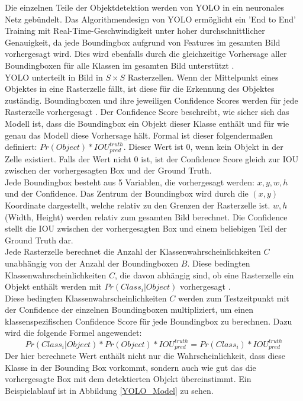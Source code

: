 {{	Die einzelnen Teile der Objektdetektion werden von YOLO in ein neuronales Netz gebündelt. Das Algorithmendesign von YOLO ermöglicht ein 'End to End' Training mit Real-Time-Geschwindigkeit unter hoher durchschnittlicher Genauigkeit, da jede Boundingbox aufgrund von Features im gesamten Bild vorhergesagt wird. Dies wird ebenfalls durch die gleichzeitige Vorhersage aller Boundingboxen für alle Klassen im gesamten Bild unterstützt \citep{Plastiras2018}. \\
	YOLO unterteilt in Bild in $S \times S $ Rasterzellen. Wenn der Mittelpunkt eines Objektes in eine Rasterzelle fällt, ist diese für die Erkennung des Objektes zuständig. Boundingboxen und ihre jeweiligen Confidence Scores werden für jede Rasterzelle vorhergesagt \citep{Plastiras2018}.
	Der Confidence Score beschreibt, wie sicher sich das Modell ist, dass die Boundingbox ein Objekt dieser Klasse enthält und für wie genau das Modell diese Vorhersage hält. Formal ist dieser folgendermaßen definiert:  $Pr (Object) * IOU^{truth}_{pred}$. Dieser Wert ist 0, wenn kein Objekt in der Zelle existiert. Falls der Wert nicht 0 ist, ist der Confidence Score gleich zur IOU zwischen der vorhergesagten Box und der Ground Truth. \\
	Jede Boundingbox besteht aus 5 Variablen, die vorhergesagt werden: $x, y, w, h$ und der Confidence. Das Zentrum der Boundingbox wird durch die $(x, y)$ Koordinate dargestellt, welche relativ zu den Grenzen der Rasterzelle ist. $w, h$ (Width, Height) werden relativ zum gesamten Bild berechnet. Die Confidence stellt die IOU zwischen der vorhergesagten Box und einem beliebigen Teil der Ground Truth dar. \\
	Jede Rasterzelle berechnet die Anzahl der Klassenwahrscheinlichkeiten $C$ unabhängig von der Anzahl der Boundingboxen $B$. Diese bedingten Klassenwahrscheinlichkeiten $C$, die davon abhängig sind, ob eine Rasterzelle ein Objekt enthält werden mit $Pr(Class_i | Object)$ vorhergesagt \citep{Plastiras2018}. \\
	Diese bedingten Klassenwahrscheinlichkeiten $C$ werden zum Testzeitpunkt mit der Confidence der einzelnen Boundingboxen multipliziert, um einen klassenspezifischen Confidence Score für jede Boundingbox zu berechnen. Dazu wird die folgende Formel angewendet: 
	\begin{equation}
	Pr(Class_i|Object) * Pr(Object) * IOU_{pred}^{truth} = Pr(Class_i) * IOU_{pred}^{truth}
	\end{equation}
	Der hier berechnete Wert enthält nicht nur die Wahrscheinlichkeit, dass diese Klasse in der Bounding Box vorkommt, sondern auch wie gut das die vorhergesagte Box mit dem detektierten Objekt übereinstimmt. Ein Beispielablauf ist in Abbildung \ref{YOLO_Model} zu sehen.
}}
